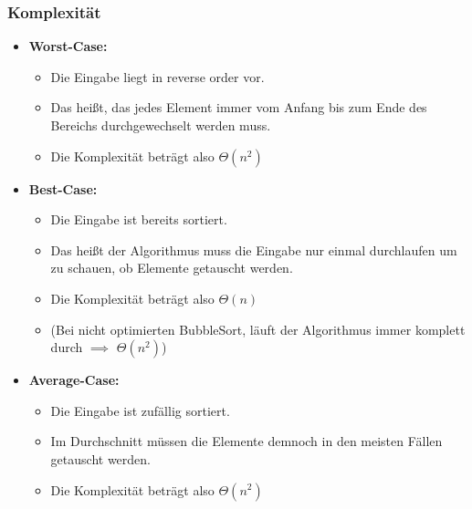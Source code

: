 \documentclass[
../AuD-Zusammenfassung.tex,
]
{subfiles}
\begin{document}
\subsubsection{Komplexität}
\begin{itemize}
    \item \textbf{Worst-Case:}
    \begin{itemize}
        \item Die Eingabe liegt in reverse order vor. 
        \item Das heißt, das jedes Element immer vom Anfang bis zum Ende des Bereichs durchgewechselt werden muss.
        \item Die Komplexität beträgt also $\Theta(n^2)$
    \end{itemize}
    \item \textbf{Best-Case:}
    \begin{itemize}
        \item Die Eingabe ist bereits sortiert.
        \item Das heißt der Algorithmus muss die Eingabe nur einmal durchlaufen um zu schauen, ob Elemente getauscht werden.
        \item Die Komplexität beträgt also $\Theta(n)$
        \item (Bei nicht optimierten BubbleSort, läuft der Algorithmus immer komplett durch $\implies$ $\Theta(n^2)$)
    \end{itemize}
    \item \textbf{Average-Case:}
    \begin{itemize}
        \item Die Eingabe ist zufällig sortiert.
        \item Im Durchschnitt müssen die Elemente demnoch in den meisten Fällen getauscht werden.
        \item Die Komplexität beträgt also $\Theta(n^2)$
    \end{itemize}
\end{itemize}

\end{document}
